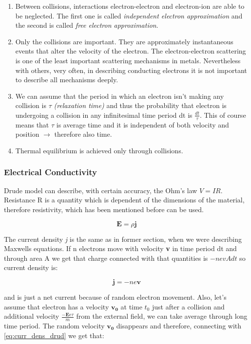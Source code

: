 \begin{enumerate}
\item Between collisions, interactions electron-electron and electron-ion are able to be neglected. The first one is called \textit{independent electron approximation} and the second is called \textit{free electron approximation}. 
\item Only the collisions are important. They are approximately instantaneous events that alter the velocity of the electron. The electron-electron scattering is one of the least important scattering mechanisms in metals. Nevertheless with others, very often, in describing conducting electrons it is not important to describe all mechanisms deeply. 
\item We can assume that the period in which an electron isn't making any collision is $\tau$ \textit{(relaxation time)} and thus the probability that electron is undergoing a collision in any infinitesimal time period dt is $\frac{dt}{\tau}$. This of course means that $\tau$ is average time and it is independent of both velocity and position $\rightarrow$ therefore also time. 
\item Thermal equilibrium is achieved only through collisions.
\end{enumerate}

\subsubsection{Electrical Conductivity}

Drude model can describe, with certain accuracy, the Ohm's law $V=IR$. Resistance R is a quantity which is dependent of the dimensions of the material, therefore resistivity, which has been mentioned before can be used.

\begin{equation}
\mathbf{E}=\rho\mathbf{j}
\end{equation}

The current density \textit{j} is the same as in former section, when we were describing Maxwells equations. If n electrons move with velocity \textbf{v} in time period dt and through area A we get that charge connected with that quantities is $-nevAdt$ so current density is:

\begin{equation}
\mathbf{j}=-ne\mathbf{v}
\label{eq:curr_dens_drud}
\end{equation}

and is just a net current because of random electron movement. 
Also, let's assume that electron has a velocity $\mathbf{v_0}$ at time $t_0$ just after a collision and additional velocity $\frac{-\mathbf{E}e\tau}{m}$ from the external field, we can take average through long time period. The random velocity $\mathbf{v_0}$ disappears and therefore, connecting with \ref{eq:curr_dens_drud} we get that:

